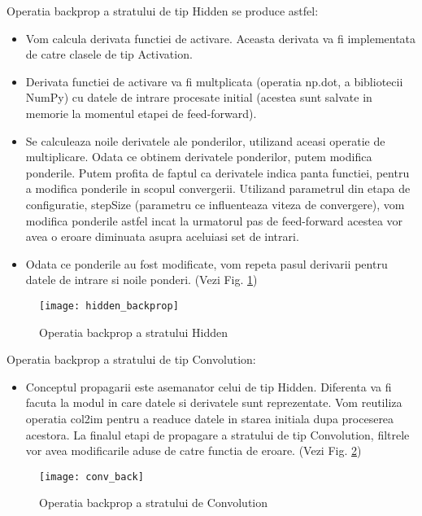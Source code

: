 	\vfill
	Operatia backprop a stratului de tip Hidden se produce astfel:
	\begin{itemize}
	\item	Vom calcula derivata functiei de activare. Aceasta derivata va fi implementata de catre clasele de tip Activation.
	
	\item	Derivata functiei de activare va fi multplicata (operatia np.dot, a bibliotecii NumPy) cu datele de intrare procesate initial (acestea sunt salvate in memorie la momentul etapei de feed-forward).
	
	
	\item	Se calculeaza noile derivatele ale ponderilor, utilizand aceasi operatie de multiplicare. Odata ce obtinem derivatele ponderilor, putem modifica ponderile. Putem profita de faptul ca derivatele indica panta functiei, pentru a modifica ponderile in scopul convergerii. Utilizand parametrul din etapa de configuratie, stepSize (parametru ce influenteaza viteza de convergere), vom modifica ponderile astfel incat la urmatorul pas de feed-forward acestea vor avea o eroare diminuata asupra aceluiasi set de intrari.
	
	\item	Odata ce ponderile au fost modificate, vom repeta pasul derivarii pentru datele de intrare si noile ponderi. (Vezi Fig. \ref{fig:hidden_backprop})\newline
	\end{itemize}	

	\begin{figure}[H]
	\texttt{[image: hidden\_backprop]}
	\caption{\label{fig:hidden_backprop} Operatia backprop a stratului Hidden}
	\end{figure}



	Operatia backprop a stratului de tip Convolution:
	\begin{itemize}
	\item	Conceptul propagarii este asemanator celui de tip Hidden. Diferenta va fi facuta la modul in care datele si derivatele sunt reprezentate. Vom reutiliza operatia col2im pentru a readuce datele in starea initiala dupa proceserea acestora.
	La finalul etapi de propagare a stratului de tip Convolution, filtrele vor avea modificarile aduse de catre functia de eroare. (Vezi Fig. \ref{fig:conv_backprop})
	\end{itemize}

	\begin{figure}[H]
	\texttt{[image: conv\_back]}
	\caption{\label{fig:conv_backprop} Operatia backprop a stratului de Convolution}
	\end{figure}
	


